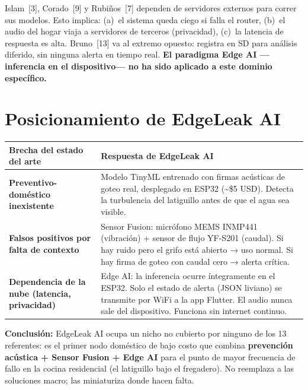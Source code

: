 \documentclass[11pt,a4paper]{article}
\begin{document}
Islam~[3], Corado~[9] y Rubiños~[7] dependen de servidores externos para correr sus
modelos. Esto implica: (a)~el sistema queda ciego si falla el router, (b)~el audio del
hogar viaja a servidores de terceros (privacidad), (c)~la latencia de respuesta es alta.
Bruno~[13] va al extremo opuesto: registra en SD para análisis diferido, sin ninguna
alerta en tiempo real. \textbf{El paradigma Edge AI —inferencia en el dispositivo— no
ha sido aplicado a este dominio específico.}

\section{Posicionamiento de EdgeLeak AI}

\vspace{2pt}
\begin{tabularx}{\linewidth}{@{} >{\small\bfseries}p{3.8cm} >{\small}X @{}}
\toprule
\textbf{Brecha del estado del arte} & \textbf{Respuesta de EdgeLeak AI} \\
\midrule
Preventivo-doméstico inexistente &
  Modelo TinyML entrenado con firmas acústicas de goteo real, desplegado en ESP32
  (\textasciitilde\$5 USD). Detecta la turbulencia del latiguillo antes de que el agua
  sea visible. \\[4pt]
Falsos positivos por falta de contexto &
  Sensor Fusion: micrófono MEMS INMP441 (vibración) + sensor de flujo YF-S201 (caudal).
  Si hay ruido pero el grifo está abierto → uso normal. Si hay firma de goteo con
  caudal cero → alerta crítica. \\[4pt]
Dependencia de la nube (latencia, privacidad) &
  Edge AI: la inferencia ocurre íntegramente en el ESP32. Solo el estado de alerta
  (JSON liviano) se transmite por WiFi a la app Flutter. El audio nunca sale del
  dispositivo. Funciona sin internet continuo. \\
\bottomrule
\end{tabularx}

\vspace{6pt}
\begin{mdframed}[linecolor=normalgreen,linewidth=1pt,backgroundcolor=green!3,
  innertopmargin=5pt,innerbottommargin=5pt,innerrightmargin=8pt,innerleftmargin=8pt]
\textbf{Conclusión:} EdgeLeak AI ocupa un nicho no cubierto por ninguno de los
13 referentes: es el primer nodo doméstico de bajo costo que combina
\textbf{prevención acústica + Sensor Fusion + Edge AI} para el punto de mayor
frecuencia de fallo en la cocina residencial (el latiguillo bajo el fregadero).
No reemplaza a las soluciones macro; las miniaturiza donde hacen falta.
\end{mdframed}
\end{document}
